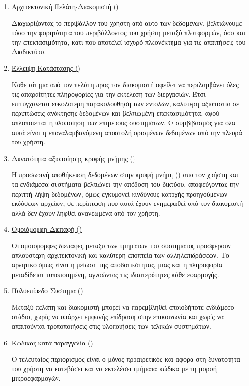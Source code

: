\begin{enumerate}
    \item \underline{Αρχιτεκτονική Πελάτη-Διακομιστή ()}
    
    Διαχωρίζοντας το περιβάλλον του χρήστη από αυτό των δεδομένων, 
    βελτιώνουμε τόσο την φορητότητα του περιβάλλοντος του χρήστη μεταξύ πλατφορμών,  
    όσο και την επεκτασιμότητα, κάτι που αποτελεί ισχυρό πλεονέκτημα για τις απαιτήσεις του Διαδικτύου.

    \item \underline{Έλλειψη Κατάστασης ()}
    
    Κάθε αίτημα από τον πελάτη προς τον διακομιστή οφείλει να περιλαμβάνει
    όλες τις απαραίτητες πληροφορίες για την εκτέλεση των διεργασιών.
    Έτσι επιτυγχάνεται ευκολότερη παρακολούθηση των εντολών,
    καλύτερη αξιοπιστία σε περιπτώσεις ανάκτησης δεδομένων και βελτιωμένη επεκτασιμότητα, 
    αφού απλοποιείται η υλοποίηση των επιμέρους συστημάτων.
    Ο συμβιβασμός για όλα αυτά είναι η επαναλαμβανόμενη αποστολή ορισμένων δεδομένων από την πλευρά του χρήστη.

    \item \underline{Δυνατότητα αξιοποίησης κρυφής μνήμης ()}
    
    Η προσωρινή αποθήκευση δεδομένων στην κρυφή μνήμη () 
    από τον χρήστη και τα ενδιάμεσα συστήματα
    βελτιώνει την απόδοση του δικτύου,
    αποφεύγοντας την περιττή λήψη δεδομένων,
    όμως εγκυμονεί κινδύνους κατοχής προηγούμενων εκδόσεων αρχείων,
    σε περίπτωση που αυτά έχουν ενημερωθεί από τον διακομιστή
    αλλά δεν έχουν ληφθεί ανανεωμένα από τον χρήστη.

    \item \underline{Ομοιόμορφη Διεπαφή ()}
    
    Οι ομοιόμορφες διεπαφές μεταξύ των τμημάτων του συστήματος προσφέρουν απλούστερη αρχιτεκτονική και καλύτερη εποπτεία των αλληλεπιδράσεων.
    Το αρνητικό όμως είναι η μείωση της αποδοτικότητας,
    μιας και η πληροφορία μεταδίδεται τυποποιημένη,
    αγνοώντας τις ιδιαιτερότητες κάθε εφαρμογής.

    \item \underline{Πολυεπίπεδο Σύστημα ()}
    
    Μεταξύ πελάτη και διακομιστή μπορεί να παρεμβληθεί οποιοδήποτε ενδιάμεσο στάδιο,
    χωρίς να υπάρχει εμφανής επίδραση στην επικοινωνία και χωρίς να απαιτούνται τροποποιήσεις στις υλοποιήσεις των τελικών συστημάτων.

    \item \underline{Κώδικας κατά παραγγελία ()}
    
    Ο τελευταίος περιορισμός είναι ο μόνος προαιρετικός και αφορά στη δυνατότητα του χρήστη
    να κατεβάσει και να εκτελέσει τμήματα κώδικα με τη μορφή μικροεφαρμογών.
\end{enumerate}

